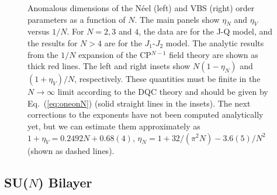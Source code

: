 \documentclass[range]{ar2e}
\begin{document}
\begin{figure}
\centerline{}
 \caption{ \label{fig:exp} Anomalous dimensions of the N\'eel (left)
    and VBS (right)
  order parameters as a function of $N$. The main panels show $\eta_N$ and $\eta_V$ versus $1/N$. For $N=2,3$ and $4$, the data are 
  for the J-Q model, and the results for $N>4$ are for the $J_1$-$J_2$ model. The analytic results 
  from the $1/N$ expansion of the CP$^{N-1}$ field theory are shown as thick red lines. The left and right insets 
  show $N(1-\eta_N)$ and $(1+\eta_V)/N$, respectively. These quantities must be finite in the  $N\rightarrow \infty$ 
  limit according to the DQC theory and should be given by Eq.~(\ref{eq:oneonN}) (solid straight lines in the insets). 
  The next corrections to the exponents have not been computed analytically yet, but we can estimate them approximately 
  as $1+\eta_V = 0.2492 N + 0.68(4)$, $\eta_N = 1+32/(\pi^2 N)-3.6(5)/N^2$ (shown as dashed lines).}
\end{figure}

\subsection{SU($N$) Bilayer}
\label{ss:bilN}
\end{document}
